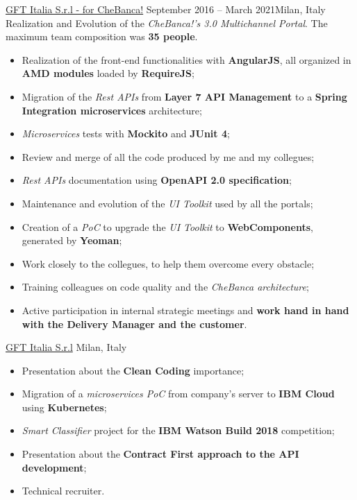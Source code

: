 \documentclass[10pt,a4paper]{altacv}
\begin{document}
\begin{adjustwidth}{0cm}{-8cm}
\divider

{\href{https://www.chebanca.it/}{GFT Italia S.r.l - for CheBanca!}}
{September 2016 -- March 2021}{Milan, Italy}
Realization and Evolution of the \textit{CheBanca!'s 3.0 Multichannel Portal}.
\newline
The maximum team composition was \textbf{35 people}.
\newline
\begin{itemize}
	\item Realization of the front-end functionalities with \textbf{AngularJS}, all organized in \textbf{AMD modules} loaded by \textbf{RequireJS};
	\item Migration of the \textit{Rest APIs} from \textbf{Layer 7 API Management} to a \textbf{Spring Integration microservices} architecture;
	\item \textit{Microservices} tests with \textbf{Mockito} and \textbf{JUnit 4};
	\item Review and merge of all the code produced by me and my collegues;
	\item \textit{Rest APIs} documentation using \textbf{OpenAPI 2.0 specification};
	\item Maintenance and evolution of the \textit{UI Toolkit} used by all the portals;
	\item Creation of a \textit{PoC} to upgrade the \textit{UI Toolkit} to \textbf{WebComponents}, generated by \textbf{Yeoman};
	\item Work closely to the collegues, to help them overcome every obstacle;
	\item Training colleagues on code quality and the \textit{CheBanca architecture};
	\item Active participation in internal strategic meetings and \textbf{work hand in hand with the Delivery Manager and the customer}.
\end{itemize}

\divider

{\href{https://www.gft.com/it/it/index/}{GFT Italia S.r.l}}
{Milan, Italy}
\begin{itemize}
	\item Presentation about the \textbf{Clean Coding} importance;
	\item Migration of a \textit{microservices PoC} from company's server to \textbf{IBM Cloud} using \textbf{Kubernetes};
	\item \textit{Smart Classifier} project for the \textbf{IBM Watson Build 2018} competition;
	\item Presentation about the \textbf{Contract First approach to the API development};
	\item Technical recruiter.
\end{itemize}


\nocite{*}

\printbibliography[heading=pubtype,
title={\printinfo{\faBook}{\href{https://ilteoood.medium.com/}{Medium articles}}},
type=book]

\end{adjustwidth}
\end{document}
